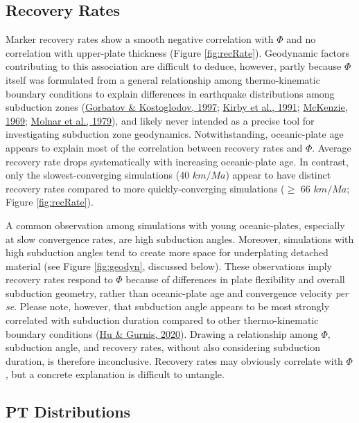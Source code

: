 \hypertarget{recovery-rates-1}{%
\subsection{Recovery Rates}\label{recovery-rates-1}}

Marker recovery rates show a smooth negative correlation with \(\Phi\) and no correlation with upper-plate thickness (Figure \ref{fig:recRate}). Geodynamic factors contributing to this association are difficult to deduce, however, partly because \(\Phi\) itself was formulated from a general relationship among thermo-kinematic boundary conditions to explain differences in earthquake distributions among subduction zones (\protect\hyperlink{ref-gorbatov1997}{Gorbatov \& Kostoglodov, 1997}; \protect\hyperlink{ref-kirby1991}{Kirby et al., 1991}; \protect\hyperlink{ref-mckenzie1969}{McKenzie, 1969}; \protect\hyperlink{ref-molnar1979}{Molnar et al., 1979}), and likely never intended as a precise tool for investigating subduction zone geodynamics. Notwithstanding, oceanic-plate age appears to explain most of the correlation between recovery rates and \(\Phi\). Average recovery rate drops systematically with increasing oceanic-plate age. In contrast, only the slowest-converging simulations (40 \(km/Ma\)) appear to have distinct recovery rates compared to more quickly-converging simulations (\(\geq\) 66 \(km/Ma\); Figure \ref{fig:recRate}).

A common observation among simulations with young oceanic-plates, especially at slow convergence rates, are high subduction angles. Moreover, simulations with high subduction angles tend to create more space for underplating detached material (see Figure \ref{fig:geodyn}, discussed below). These observations imply recovery rates respond to \(\Phi\) because of differences in plate flexibility and overall subduction geometry, rather than oceanic-plate age and convergence velocity \emph{per se}. Please note, however, that subduction angle appears to be most strongly correlated with subduction duration compared to other thermo-kinematic boundary conditions (\protect\hyperlink{ref-hu2020}{Hu \& Gurnis, 2020}). Drawing a relationship among \(\Phi\), subduction angle, and recovery rates, without also considering subduction duration, is therefore inconclusive. Recovery rates may obviously correlate with \(\Phi\), but a concrete explanation is difficult to untangle.

\hypertarget{pt-distributions}{%
\subsection{PT Distributions}\label{pt-distributions}}

